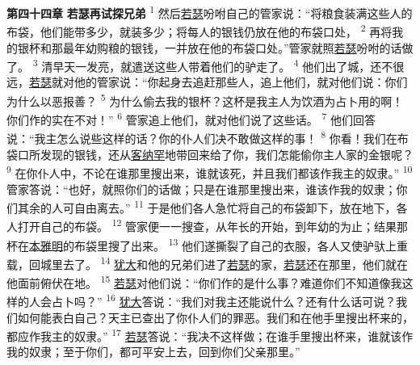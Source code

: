\textbf{第四十四章 }
\textbf{若瑟再试探兄弟 }
\textsuperscript{1}
然后\uline{若瑟}吩咐自己的管家说：“将粮食装满这些人的布袋，他们能带多少，就装多少；将每人的银钱仍放在他的布袋口处，
\textsuperscript{2}
再将我的银杯和那最年幼购粮的银钱，一并放在他的布袋口处。”管家就照\uline{若瑟}吩咐的话做了。
\textsuperscript{3}
清早天一发亮，就遣送这些人带着他们的驴走了。
\textsuperscript{4}
他们出了城，还不很远，\uline{若瑟}就对他的管家说：“你起身去追赶那些人，追上他们，就对他们说：你们为什么以恶报善？
\textsuperscript{5}
为什么偷去我的银杯？这杯是我主人为饮酒为占卜用的啊！你们作的实在不对！”
\textsuperscript{6}
管家追上他们，就对他们说了这些话。
\textsuperscript{7}
他们回答说：“我主怎么说些这样的话？你的仆人们决不敢做这样的事！
\textsuperscript{8}
你看！我们在布袋口所发现的银钱，还从\uline{客纳罕}地带回来给了你，我们怎能偷你主人家的金银呢？
\textsuperscript{9}
在你仆人中，不论在谁那里搜出来，谁就该死，并且我们都该作我主的奴隶。”
\textsuperscript{10}
管家答说：“也好，就照你们的话做；只是在谁那里搜出来，谁该作我的奴隶；你们其余的人可自由离去。”
\textsuperscript{11}
于是他们各人急忙将自己的布袋卸下，放在地下，各人打开自己的布袋。
\textsuperscript{12}
管家便一一搜查，从年长的开始，到年幼的为止；结果那杯在\uline{本雅明}的布袋里搜了出来。
\textsuperscript{13}
他们遂撕裂了自己的衣服，各人又使驴驮上重载，回城里去了。
\textsuperscript{14}
\uline{犹大}和他的兄弟们进了\uline{若瑟}的家，\uline{若瑟}还在那里，他们就在他面前俯伏在地。
\textsuperscript{15}
\uline{若瑟}对他们说：“你们作的是什么事？难道你们不知道像我这样的人会占卜吗？”
\textsuperscript{16}
\uline{犹大}答说：“我们对我主还能说什么？还有什么话可说？我们如何能表白自己？天主已查出了你仆人们的罪恶。我们和在他手里搜出杯来的，都应作我主的奴隶。”
\textsuperscript{17}
\uline{若瑟}答说：“我决不这样做；在谁手里搜出杯来，谁就该作我的奴隶；至于你们，都可平安上去，回到你们父亲那里。”

